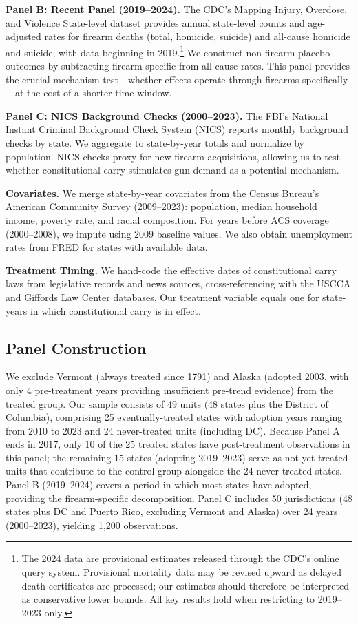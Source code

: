 \documentclass[12pt]{article}
\begin{document}
\textbf{Panel B: Recent Panel (2019--2024).} The CDC's Mapping Injury, Overdose, and Violence State-level dataset provides annual state-level counts and age-adjusted rates for firearm deaths (total, homicide, suicide) and all-cause homicide and suicide, with data beginning in 2019.\footnote{The 2024 data are provisional estimates released through the CDC's online query system. Provisional mortality data may be revised upward as delayed death certificates are processed; our estimates should therefore be interpreted as conservative lower bounds. All key results hold when restricting to 2019--2023 only.} We construct non-firearm placebo outcomes by subtracting firearm-specific from all-cause rates. This panel provides the crucial mechanism test---whether effects operate through firearms specifically---at the cost of a shorter time window.

\textbf{Panel C: NICS Background Checks (2000--2023).} The FBI's National Instant Criminal Background Check System (NICS) reports monthly background checks by state. We aggregate to state-by-year totals and normalize by population. NICS checks proxy for new firearm acquisitions, allowing us to test whether constitutional carry stimulates gun demand as a potential mechanism.

\textbf{Covariates.} We merge state-by-year covariates from the Census Bureau's American Community Survey (2009--2023): population, median household income, poverty rate, and racial composition. For years before ACS coverage (2000--2008), we impute using 2009 baseline values. We also obtain unemployment rates from FRED for states with available data.

\textbf{Treatment Timing.} We hand-code the effective dates of constitutional carry laws from legislative records and news sources, cross-referencing with the USCCA and Giffords Law Center databases. Our treatment variable equals one for state-years in which constitutional carry is in effect.

\subsection{Panel Construction}

We exclude Vermont (always treated since 1791) and Alaska (adopted 2003, with only 4 pre-treatment years providing insufficient pre-trend evidence) from the treated group. Our sample consists of 49 units (48 states plus the District of Columbia), comprising 25 eventually-treated states with adoption years ranging from 2010 to 2023 and 24 never-treated units (including DC). Because Panel A ends in 2017, only 10 of the 25 treated states have post-treatment observations in this panel; the remaining 15 states (adopting 2019--2023) serve as not-yet-treated units that contribute to the control group alongside the 24 never-treated states. Panel B (2019--2024) covers a period in which most states have adopted, providing the firearm-specific decomposition. Panel C includes 50 jurisdictions (48 states plus DC and Puerto Rico, excluding Vermont and Alaska) over 24 years (2000--2023), yielding 1,200 observations.
\end{document}
